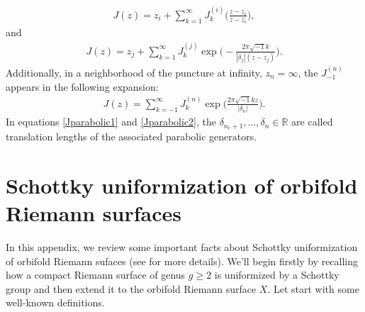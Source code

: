 \documentclass[a4paper,11pt]{article}
\begin{document}
\begin{equation*}
\begin{aligned}
J(z) =z_i + \sum_{k=1}^{\infty} J_k^{(i)} \Big(
\frac{z-z_i}{z-\bar{z_i}}
\Big),
\end{aligned}
\end{equation*}
and
\begin{equation}
\begin{aligned}
J(z) = z_j + \sum_{k=1}^{\infty} J_k^{(j)} \exp \Big(
-\frac{2\pi \sqrt{-1} k}{|\delta_j| (z-z_j)}
\Big).\label{Jparabolic1}
\end{aligned}
\end{equation}
Additionally, in a neighborhood of the puncture at infinity, $z_n = \infty$, the $J_{-1}^{(n)}$ appears in the following expansion:
\begin{equation}
\begin{aligned}
J(z) = \sum_{k=-1}^{\infty}
J_k^{(n)} \exp\Big(
\frac{2\pi\sqrt{-1}kz}{|\delta_n|}
\Big).\label{Jparabolic2}
\end{aligned}
\end{equation}
In equations \eqref{Jparabolic1} and \eqref{Jparabolic2}, the $\delta_{n_e+1}, \dots, \delta_{n} \in \mathbb{R}$ are called translation lengths of the associated parabolic generators.
\section{Schottky uniformization of orbifold Riemann surfaces}\label{Schotkkyreview}
In this appendix, we review some important facts about Schottky uniformization of orbifold Riemann sufaces (see \cite{Taghavi2024classical} for more details).  We'll begin firstly by recalling how a compact Riemann surface of genus $g\geq2$ is uniformized by a Schottky group and then extend it to the orbifold Riemann surface $X$. Let start with some well-known definitions.   
\end{document}

